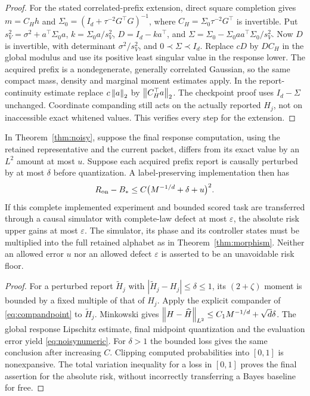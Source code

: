 \begin{proof}
For the stated correlated-prefix extension, direct square completion gives $m=C_Hh$ and $\Sigma_0=(I_d+\tau^{-2}G^\top G)^{-1}$, where $C_H=\Sigma_0\tau^{-2}G^\top$ is invertible. Put $s_V^2=\sigma^2+a^\top\Sigma_0a$, $k=\Sigma_0a/s_V^2$, $D=I_d-ka^\top$, and $\Sigma=\Sigma_0-\Sigma_0aa^\top\Sigma_0/s_V^2$. Now $D$ is invertible, with determinant $\sigma^2/s_V^2$, and $0\prec\Sigma\prec I_d$. Replace $cD$ by $DC_H$ in the global modulus and use its positive least singular value in the response lower. The acquired prefix is a nondegenerate, generally correlated Gaussian, so the same compact mass, density and marginal moment estimates apply. In the report-continuity estimate replace $c\left\lVert a\right\rVert_2$ by $\left\lVert C_H^\top a\right\rVert_2$. The checkpoint proof uses $I_d-\Sigma$ unchanged. Coordinate companding still acts on the actually reported $H_j$, not on inaccessible exact whitened values. This verifies every step for the extension.
\end{proof}

\begin{corollary}\label{cor:noisynumeric}
In Theorem~\ref{thm:noisy}, suppose the final response computation, using the retained representative and the current packet, differs from its exact value by an $L^2$ amount at most $u$. Suppose each acquired prefix report is causally perturbed by at most $\delta$ before quantization. A label-preserving implementation then has
\begin{equation}\label{eq:noisynumeric}
 R_{\mathrm{on}}-B_*\le C\bigl(M^{-1/d}+\delta+u\bigr)^2.
\end{equation}
If this complete implemented experiment and bounded scored task are transferred through a causal simulator with complete-law defect at most $\varepsilon$, the absolute risk upper gains at most $\varepsilon$. The simulator, its phase and its controller states must be multiplied into the full retained alphabet as in Theorem~\ref{thm:morphism}. Neither an allowed error $u$ nor an allowed defect $\varepsilon$ is asserted to be an unavoidable risk floor.
\end{corollary}
\begin{proof}
For a perturbed report $\widetilde H_j$ with $|\widetilde H_j-H_j|\le\delta\le1$, its $(2+\zeta)$ moment is bounded by a fixed multiple of that of $H_j$. Apply the explicit compander of \eqref{eq:compandpoint} to $\widetilde H_j$. Minkowski gives $\left\lVert H-\widehat H\right\rVert_{L^2}\le C_1M^{-1/d}+\sqrt d\delta$. The global response Lipschitz estimate, final midpoint quantization and the evaluation error yield \eqref{eq:noisynumeric}. For $\delta>1$ the bounded loss gives the same conclusion after increasing $C$. Clipping computed probabilities into $[0,1]$ is nonexpansive. The total variation inequality for a loss in $[0,1]$ proves the final assertion for the absolute risk, without incorrectly transferring a Bayes baseline for free.
\end{proof}


